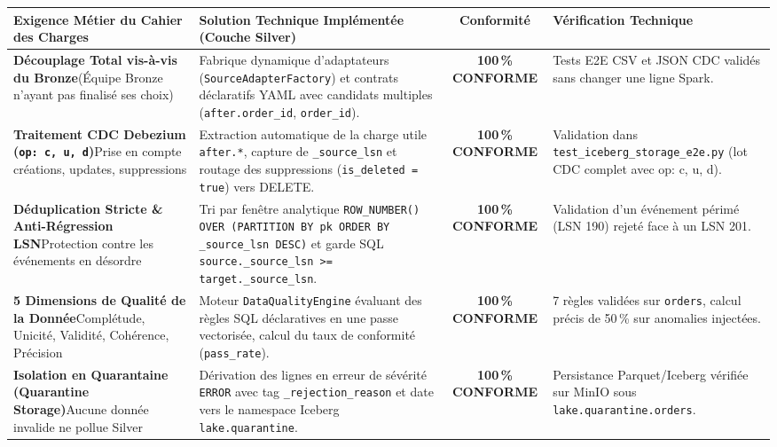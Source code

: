 \documentclass[9pt,a4paper,landscape]{article}
\begin{document}
\fontsize{7.5pt}{9.2pt}\selectfont
\noindent
\begin{tabularx}{\textwidth}{p{6cm} p{9.2cm} c p{5.5cm}}
\toprule
\rowcolor{headerbg}
\textbf{Exigence Métier du Cahier des Charges} & \textbf{Solution Technique Implémentée (Couche Silver)} & \textbf{Conformité} & \textbf{Vérification Technique} \\
\midrule
\textbf{Découplage Total vis-à-vis du Bronze}\newline (Équipe Bronze n'ayant pas finalisé ses choix) & Fabrique dynamique d'adaptateurs (\texttt{SourceAdapterFactory}) et contrats déclaratifs YAML avec candidats multiples (\texttt{after.order\_id}, \texttt{order\_id}). & \cellcolor{successbg}\color{successtext}\textbf{100\,\% CONFORME} & Tests E2E CSV et JSON CDC validés sans changer une ligne Spark. \\
\midrule
\textbf{Traitement CDC Debezium (\texttt{op: c, u, d})}\newline Prise en compte créations, updates, suppressions & Extraction automatique de la charge utile \texttt{after.*}, capture de \texttt{\_source\_lsn} et routage des suppressions (\texttt{is\_deleted = true}) vers DELETE. & \cellcolor{successbg}\color{successtext}\textbf{100\,\% CONFORME} & Validation dans \texttt{test\_iceberg\_storage\_e2e.py} (lot CDC complet avec op: c, u, d). \\
\midrule
\textbf{Déduplication Stricte \& Anti-Régression LSN}\newline Protection contre les événements en désordre & Tri par fenêtre analytique \texttt{ROW\_NUMBER() OVER (PARTITION BY pk ORDER BY \_source\_lsn DESC)} et garde SQL \texttt{source.\_source\_lsn >= target.\_source\_lsn}. & \cellcolor{successbg}\color{successtext}\textbf{100\,\% CONFORME} & Validation d'un événement périmé (LSN 190) rejeté face à un LSN 201. \\
\midrule
\textbf{5 Dimensions de Qualité de la Donnée}\newline Complétude, Unicité, Validité, Cohérence, Précision & Moteur \texttt{DataQualityEngine} évaluant des règles SQL déclaratives en une passe vectorisée, calcul du taux de conformité (\texttt{pass\_rate}). & \cellcolor{successbg}\color{successtext}\textbf{100\,\% CONFORME} & 7 règles validées sur \texttt{orders}, calcul précis de 50\,\% sur anomalies injectées. \\
\midrule
\textbf{Isolation en Quarantaine (Quarantine Storage)}\newline Aucune donnée invalide ne pollue Silver & Dérivation des lignes en erreur de sévérité \texttt{ERROR} avec tag \texttt{\_rejection\_reason} et date vers le namespace Iceberg \texttt{lake.quarantine}. & \cellcolor{successbg}\color{successtext}\textbf{100\,\% CONFORME} & Persistance Parquet/Iceberg vérifiée sur MinIO sous \texttt{lake.quarantine.orders}. \\

\end{tabularx}
\end{document}
